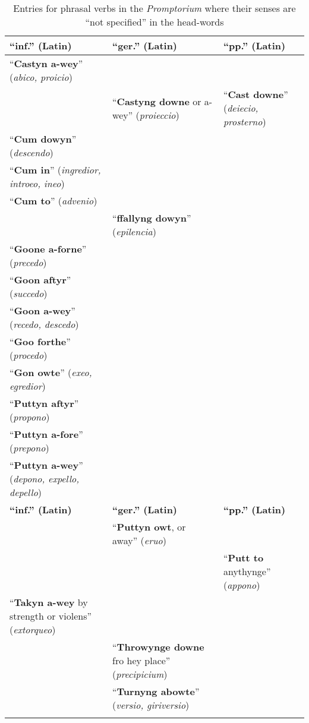 \documentclass[output=paper,colorlinks,citecolor=brown,arabicfont,chinesefont]{langscibook}
\begin{document}
\begin{table}
\caption {Entries for phrasal verbs in the \textit{Promptorium} where their senses are “not specified” in the head-words }
\label{tab:miyoshi:table7}
\small
\begin{tabularx}{\linewidth}{QQQ}
\lsptoprule
\textbf{“inf.” (Latin)} &\textbf{“ger.” (Latin)} & \textbf{“pp.” (Latin)} \\
\midrule
“\textbf{Castyn a-wey}” (\emph{abico, proicio}) & &  \\
 & “\textbf{Castyng downe} or a-wey” (\emph{proieccio}) & “\textbf{Cast downe}” (\emph{deiecio, prosterno}) \\
“\textbf{Cum dowyn}” (\emph{descendo}) & &  \\
“\textbf{Cum in}” (\emph{ingredior, introeo, ineo}) & &  \\
“\textbf{Cum to}” (\emph{advenio}) & &  \\
 & “\textbf{ffallyng dowyn}” (\emph{epilencia}) &  \\
“\textbf{Goone a-forne}” (\emph{precedo}) &  &  \\
“\textbf{Goon aftyr}” (\emph{succedo}) & & \\
“\textbf{Goon a-wey}” (\emph{recedo, descedo}) & & \\
“\textbf{Goo forthe}” (\emph{procedo}) &  &  \\
“\textbf{Gon owte}” (\emph{exeo, egredior}) & &  \\
“\textbf{Puttyn aftyr}” (\emph{propono}) & &  \\
“\textbf{Puttyn a-fore}” (\emph{prepono}) & &  \\
“\textbf{Puttyn a-wey}” (\emph{depono, expello, depello}) & &  \\
%
\textbf{“inf.” (Latin)} &\textbf{“ger.” (Latin)} & \textbf{“pp.” (Latin)} \\
 & “\textbf{Puttyn owt}, or away” (\emph{eruo}) &  \\
 &  & “\textbf{Putt to} anythynge” (\emph{appono}) \\
“\textbf{Takyn a-wey} by strength or violens” (\emph{extorqueo}) & & \\
 & “\textbf{Throwynge downe} fro hey place” (\emph{precipicium}) & \\
 & “\textbf{Turnyng abowte}” (\emph{versio, giriversio}) &  \\
 \lspbottomrule
\end{tabularx}
\end{table}
\end{document}
